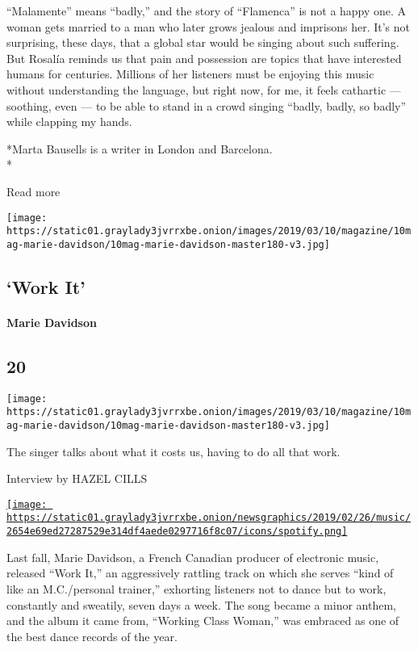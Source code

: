 ``Malamente'' means ``badly,'' and the story of ``Flamenca'' is not a
happy one. A woman gets married to a man who later grows jealous and
imprisons her. It's not surprising, these days, that a global star would
be singing about such suffering. But Rosalía reminds us that pain and
possession are topics that have interested humans for centuries.
Millions of her listeners must be enjoying this music without
understanding the language, but right now, for me, it feels cathartic
--- soothing, even --- to be able to stand in a crowd singing ``badly,
badly, so badly'' while clapping my hands.

*Marta Bausells is a writer in London and Barcelona.\\
*

Read more

\texttt{[image: https://static01.graylady3jvrrxbe.onion/images/2019/03/10/magazine/10mag-marie-davidson/10mag-marie-davidson-master180-v3.jpg]}

\hypertarget{--work-it}{%
\subsection{\texorpdfstring{ `Work It'}{  `Work It'}}\label{--work-it}}

\hypertarget{marie-davidson}{%
\paragraph{Marie Davidson}\label{marie-davidson}}

\hypertarget{20}{%
\subsection{20}\label{20}}

\texttt{[image: https://static01.graylady3jvrrxbe.onion/images/2019/03/10/magazine/10mag-marie-davidson/10mag-marie-davidson-master180-v3.jpg]}

The singer talks about what it costs us, having to do all that work.

Interview by HAZEL CILLS

\href{https://open.spotify.com/track/5QnzAZ2W3Ap3gSiO2vsGQG}{\texttt{[image: https://static01.graylady3jvrrxbe.onion/newsgraphics/2019/02/26/music/2654e69ed27287529e314df4aede0297716f8c07/icons/spotify.png]}}

Last fall, Marie Davidson, a French Canadian producer of electronic
music, released ``Work It,'' an aggressively rattling track on which she
serves ``kind of like an M.C./personal trainer,'' exhorting listeners
not to dance but to work, constantly and sweatily, seven days a week.
The song became a minor anthem, and the album it came from, ``Working
Class Woman,'' was embraced as one of the best dance records of the
year.


